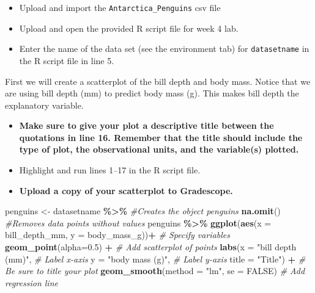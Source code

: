 \documentclass[
]{report}
\newenvironment{Shaded}{\begin{snugshade}}{\end{snugshade}}
\newcommand{\AttributeTok}[1]{\textcolor[rgb]{0.13,0.29,0.53}{#1}}
\newcommand{\CommentTok}[1]{\textcolor[rgb]{0.56,0.35,0.01}{\textit{#1}}}
\newcommand{\ConstantTok}[1]{\textcolor[rgb]{0.56,0.35,0.01}{#1}}
\newcommand{\FloatTok}[1]{\textcolor[rgb]{0.00,0.00,0.81}{#1}}
\newcommand{\FunctionTok}[1]{\textcolor[rgb]{0.13,0.29,0.53}{\textbf{#1}}}
\newcommand{\NormalTok}[1]{#1}
\newcommand{\OtherTok}[1]{\textcolor[rgb]{0.56,0.35,0.01}{#1}}
\newcommand{\SpecialCharTok}[1]{\textcolor[rgb]{0.81,0.36,0.00}{\textbf{#1}}}
\newcommand{\StringTok}[1]{\textcolor[rgb]{0.31,0.60,0.02}{#1}}
\begin{document}
\begin{itemize}
\item
  Upload and import the \texttt{Antarctica\_Penguins} csv file
\item
  Upload and open the provided R script file for week 4 lab.
\item
  Enter the name of the data set (see the environment tab) for \texttt{datasetname} in the R script file in line 5.
\end{itemize}

First we will create a scatterplot of the bill depth and body mass. Notice that we are using bill depth (mm) to predict body mass (g). This makes bill depth the explanatory variable.

\begin{itemize}
\item
  \textbf{Make sure to give your plot a descriptive title between the quotations in line 16. Remember that the title should include the type of plot, the observational units, and the variable(s) plotted.}
\item
  Highlight and run lines 1--17 in the R script file.
\item
  \textbf{Upload a copy of your scatterplot to Gradescope.}
\end{itemize}

\begin{Shaded}
\begin{Highlighting}[]
\NormalTok{penguins }\OtherTok{\textless{}{-}}\NormalTok{ datasetname }\SpecialCharTok{\%\textgreater{}\%} \CommentTok{\#Creates the object penguins}
    \FunctionTok{na.omit}\NormalTok{() }\CommentTok{\#Removes data points without values}
\NormalTok{penguins }\SpecialCharTok{\%\textgreater{}\%}
  \FunctionTok{ggplot}\NormalTok{(}\FunctionTok{aes}\NormalTok{(}\AttributeTok{x =}\NormalTok{ bill\_depth\_mm, }\AttributeTok{y =}\NormalTok{ body\_mass\_g))}\SpecialCharTok{+}  \CommentTok{\# Specify variables}
  \FunctionTok{geom\_point}\NormalTok{(}\AttributeTok{alpha=}\FloatTok{0.5}\NormalTok{) }\SpecialCharTok{+}  \CommentTok{\# Add scatterplot of points}
  \FunctionTok{labs}\NormalTok{(}\AttributeTok{x =} \StringTok{"bill depth (mm)"}\NormalTok{,  }\CommentTok{\# Label x{-}axis}
       \AttributeTok{y =} \StringTok{"body mass (g)"}\NormalTok{,  }\CommentTok{\# Label y{-}axis}
       \AttributeTok{title =} \StringTok{"Title"}\NormalTok{) }\SpecialCharTok{+} \CommentTok{\# Be sure to title your plot}
  \FunctionTok{geom\_smooth}\NormalTok{(}\AttributeTok{method =} \StringTok{"lm"}\NormalTok{, }\AttributeTok{se =} \ConstantTok{FALSE}\NormalTok{)  }\CommentTok{\# Add regression line}
\end{Highlighting}
\end{Shaded}
\end{document}
